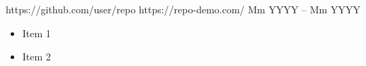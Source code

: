 \documentclass[10pt,a4paper,ragged2e,withhyper]{altacv}
\begin{document}
\begin{paracol}{2}
{                        {https://github.com/user/repo} %
                        \cvrepo{\faGlobe} %
                        {https://repo-demo.com/} %
                 }
                 {Mm YYYY -- Mm YYYY}%
                 {}
                \begin{itemize}
                    \item {Item 1} %
                    \item {Item 2} %
                \end{itemize}
                \divider
        
    \end{paracol}

    \newcommand{\hide}[1]
    {}
    \hide{
    }
\end{document}
